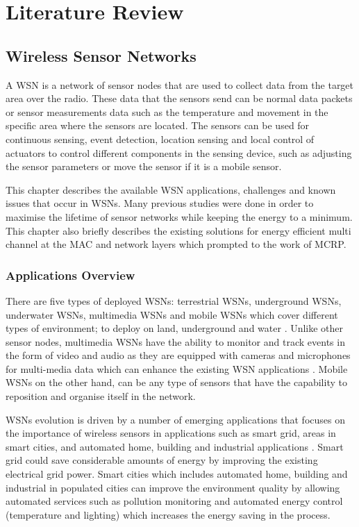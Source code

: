 \chapter{Literature Review}
\label{literatureReview}

\section{Wireless Sensor Networks}
A WSN is a network of sensor nodes that are used to collect data from the target area over the radio. These data that the sensors send can be normal data packets or sensor measurements data such as the temperature and movement in the specific area where the sensors are located. The sensors can be used for continuous sensing, event detection, location sensing and local control of actuators to control different components in the sensing device, such as adjusting the sensor parameters or move the sensor if it is a mobile sensor.

This chapter describes the available WSN applications, challenges and known issues that occur in WSNs. Many previous studies were done in order to maximise the lifetime of sensor networks while keeping the energy to a minimum. This chapter also briefly describes the existing solutions for energy efficient multi channel at the MAC and network layers which prompted to the work of MCRP. 

\subsection{Applications Overview}
There are five types of deployed WSNs: terrestrial WSNs, underground WSNs, underwater WSNs, multimedia WSNs and mobile WSNs which cover different types of environment; to deploy on land, underground and water \cite{wsnSurvey1}. Unlike other sensor nodes, multimedia WSNs have the ability to monitor and track events in the form of video and audio as they are equipped with cameras and microphones for multi-media data which can enhance the existing WSN applications \cite{wsnSurvey3}. Mobile WSNs on the other hand, can be any type of sensors that have the capability to reposition and organise itself in the network.

WSNs evolution is driven by a number of emerging applications that focuses on the importance of wireless sensors in applications such as smart grid, areas in smart cities, and automated home, building and industrial applications \cite{beyondInteroperability}. Smart grid could save considerable amounts of energy by improving the existing electrical grid power. Smart cities which includes automated home, building and industrial in populated cities can improve the environment quality by allowing automated services such as pollution monitoring and automated energy control (temperature and lighting) which increases the energy saving in the process. 


